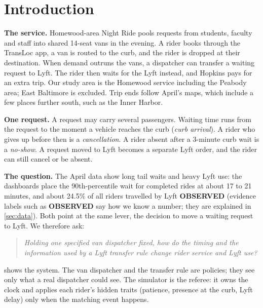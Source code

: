 \documentclass{article}
\newcommand{\lab}[1]{{\footnotesize\textsf{\textbf{#1}}}}
\newcommand{\OBS}{\lab{OBSERVED}}
\begin{document}
\section{Introduction}\label{sec:intro}

\textbf{The service.} Homewood-area Night Ride pools requests from students, faculty and staff into shared 14-seat vans in the evening. A rider books through the TransLoc app, a van is routed to the curb, and the rider is dropped at their destination. When demand outruns the vans, a dispatcher can transfer a waiting request to Lyft. The rider then waits for the Lyft instead, and Hopkins pays for an extra trip. Our study area is the Homewood service including the Peabody area; East Baltimore is excluded. Trip ends follow April's maps, which include a few places further south, such as the Inner Harbor.

\textbf{One request.} A request may carry several passengers. Waiting time runs from the request to the moment a vehicle reaches the curb (\emph{curb arrival}). A rider who gives up before then is a \emph{cancellation}. A rider absent after a 3-minute curb wait is a \emph{no-show}. A request moved to Lyft becomes a separate Lyft order, and the rider can still cancel or be absent.

\textbf{The question.} The April data show long tail waits and heavy Lyft use: the dashboards place the 90th-percentile wait for completed rides at about 17 to 21 minutes, and about 24.5\% of all riders travelled by Lyft \OBS{} (evidence labels such as \OBS{} say how we know a number; they are explained in \cref{sec:data}). Both point at the same lever, the decision to move a waiting request to Lyft. We therefore ask:

\begin{quote}\itshape
Holding one specified van dispatcher fixed, how do the timing and the information used by a Lyft transfer rule change rider service and Lyft use?
\end{quote}

 shows the system. The van dispatcher and the transfer rule are policies; they see only what a real dispatcher could see. The simulator is the referee: it owns the clock and applies each rider's hidden traits (patience, presence at the curb, Lyft delay) only when the matching event happens.
\end{document}
